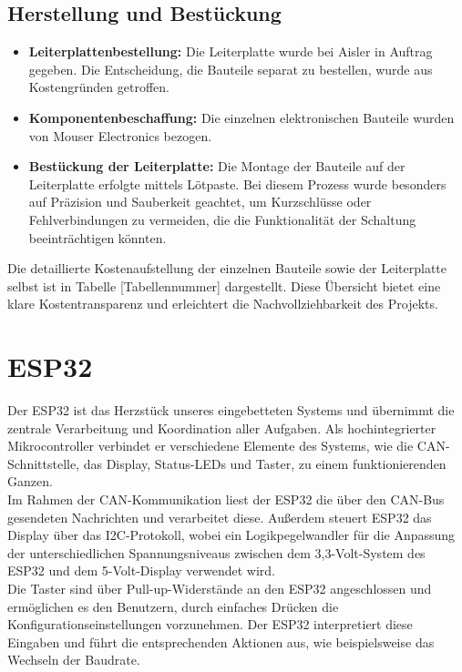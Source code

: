 \subsection{Herstellung und Bestückung}
\begin{itemize}
    \item \textbf{Leiterplattenbestellung:} Die Leiterplatte wurde bei Aisler in Auftrag gegeben. Die Entscheidung, die Bauteile separat zu bestellen, wurde aus Kostengründen getroffen.
    \item \textbf{Komponentenbeschaffung:} Die einzelnen elektronischen Bauteile wurden von Mouser Electronics bezogen.
    \item \textbf{Bestückung der Leiterplatte:} Die Montage der Bauteile auf der Leiterplatte erfolgte mittels Lötpaste. Bei diesem Prozess wurde besonders auf Präzision und Sauberkeit geachtet, um Kurzschlüsse oder Fehlverbindungen zu vermeiden, die die Funktionalität der Schaltung beeinträchtigen könnten.
\end {itemize}

\noindent Die detaillierte Kostenaufstellung der einzelnen Bauteile sowie der Leiterplatte selbst ist in Tabelle [Tabellennummer] dargestellt. Diese Übersicht bietet eine klare Kostentransparenz und erleichtert die Nachvollziehbarkeit des Projekts.\\

\section{ESP32}
Der ESP32 ist das Herzstück unseres eingebetteten Systems und übernimmt die zentrale Verarbeitung und Koordination aller Aufgaben. Als hochintegrierter Mikrocontroller verbindet er verschiedene Elemente des Systems, wie die CAN-Schnittstelle, das Display, Status-LEDs und Taster, zu einem funktionierenden Ganzen.\\

\noindent Im Rahmen der CAN-Kommunikation liest der ESP32 die über den CAN-Bus gesendeten Nachrichten und verarbeitet diese. Außerdem steuert ESP32 das Display über das I2C-Protokoll, wobei ein Logikpegelwandler für die Anpassung der unterschiedlichen Spannungsniveaus zwischen dem 3,3-Volt-System des ESP32 und dem 5-Volt-Display verwendet wird.\\

\noindent Die Taster sind über Pull-up-Widerstände an den ESP32 angeschlossen und ermöglichen es den Benutzern, durch einfaches Drücken die Konfigurationseinstellungen vorzunehmen. Der ESP32 interpretiert diese Eingaben und führt die entsprechenden Aktionen aus, wie beispielsweise das Wechseln der Baudrate.\\

